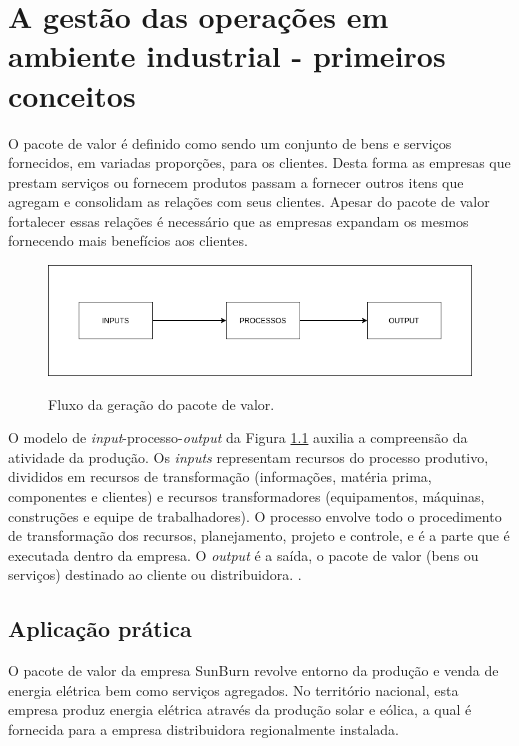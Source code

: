 \chapter{A gestão das operações em ambiente industrial - primeiros conceitos}
\label{chap:gestao_operacoes}

O pacote de valor é definido como sendo um conjunto de bens e serviços fornecidos, em variadas proporções, para os clientes. Desta forma as empresas que prestam serviços ou fornecem produtos passam a fornecer outros itens que agregam e consolidam as relações com seus clientes.
Apesar do pacote de valor fortalecer essas relações é necessário que as empresas expandam os mesmos fornecendo mais benefícios aos clientes.

\begin{figure}[H]
    \caption{Fluxo da geração do pacote de valor.}
    \includegraphics[width=\textwidth]{images/pacote_valor.png}
    \label{fig:pacotevalor}

\end{figure}

O modelo de \textit{input}-processo-\textit{output} da Figura \ref{fig:pacotevalor} auxilia a compreensão da atividade da produção. Os \textit{inputs} representam recursos do processo produtivo, divididos em recursos de transformação (informações, matéria prima, componentes e clientes) e recursos transformadores (equipamentos, máquinas, construções e equipe de trabalhadores). O processo envolve todo o procedimento de transformação dos recursos, planejamento, projeto e controle, e é a parte que é executada dentro da empresa. O \textit{output} é a saída, o pacote de valor (bens ou serviços) destinado ao cliente ou distribuidora. \cite{slack2006administracao}.

\section{Aplicação prática}
\label{sec:gestao_operacoes_aplicacao}
O pacote de valor da empresa SunBurn revolve entorno da produção e venda de energia elétrica bem como serviços agregados. No território nacional, esta empresa produz energia elétrica através da produção solar e eólica, a qual é fornecida para a empresa distribuidora regionalmente instalada.

